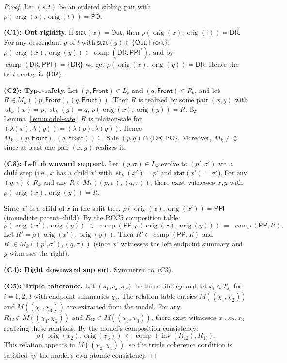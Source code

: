 \documentclass[11pt]{article}
\theoremstyle{definition}
\theoremstyle{remark}
\newcommand{\DR}{\mathsf{DR}}
\newcommand{\PO}{\mathsf{PO}}
\newcommand{\PP}{\mathsf{PP}}
\newcommand{\PPI}{\mathsf{PPI}}
\newcommand{\st}{\operatorname{st}}
\newcommand{\comp}{\operatorname{comp}}
\newcommand{\inv}{\operatorname{inv}}
\newcommand{\orig}{\operatorname{orig}}
\newcommand{\Safe}{\operatorname{Safe}}
\newcommand{\Out}{\mathsf{Out}}
\newcommand{\Front}{\mathsf{Front}}
\begin{document}
\begin{proof}
Let $(s,t)$ be an ordered sibling pair with
$\rho(\orig(s),\orig(t))=\PO$.

\medskip\noindent\textbf{(C1): Out rigidity.}\;
If $\mathsf{stat}(x)=\Out$, then $\rho(\orig(x),\orig(t))=\DR$.
For any descendant $y$ of $t$ with $\mathsf{stat}(y)\in\{\Out,\Front\}$:
$\rho(\orig(x),\orig(y))\in\comp(\DR,\PPI^*)$, and by
$\comp(\DR,\PPI)=\{\DR\}$ we get $\rho(\orig(x),\orig(y))=\DR$.
Hence the table entry is $\{\DR\}$.\;\checkmark

\medskip\noindent\textbf{(C2): Type-safety.}\;
Let $(p,\Front)\in L_k$ and $(q,\Front)\in R_k$, and let
$R\in M_k((p,\Front),(q,\Front))$.  Then $R$ is realized by some pair
$(x,y)$ with $\st_k(x)=p$, $\st_k(y)=q$, $\rho(\orig(x),\orig(y))=R$.
By Lemma~\ref{lem:model-safe}, $R$ is relation-safe for
$(\lambda(x),\lambda(y))=(\lambda(p),\lambda(q))$.
Hence $M_k((p,\Front),(q,\Front))\subseteq\Safe(p,q)\cap\{\DR,\PO\}$.
Moreover, $M_k\ne\varnothing$ since at least one pair $(x,y)$
realizes it.
\;\checkmark

\medskip\noindent\textbf{(C3): Left downward support.}\;
Let $(p,\sigma)\in L_k$ evolve to $(p',\sigma')$ via a child step
(i.e., $x$ has a child $x'$ with $\st_k(x')=p'$ and
$\mathsf{stat}(x')=\sigma'$).  For any $(q,\tau)\in R_k$ and any
$R\in M_k((p,\sigma),(q,\tau))$, there exist witnesses $x,y$ with
$\rho(\orig(x),\orig(y))=R$.

Since $x'$ is a child of $x$ in the split tree,
$\rho(\orig(x),\orig(x'))=\PPI$ (immediate parent--child).  By the
RCC5 composition table:
\[
\rho(\orig(x'),\orig(y)) \;\in\;
  \comp(\PP,\rho(\orig(x),\orig(y))) \;=\; \comp(\PP,R).
\]
Let $R'=\rho(\orig(x'),\orig(y))$.  Then $R'\in\comp(\PP,R)$ and
$R'\in M_k((p',\sigma'),(q,\tau))$ (since $x'$ witnesses the left
endpoint summary and $y$ witnesses the right).
\;\checkmark

\medskip\noindent\textbf{(C4): Right downward support.}\;
Symmetric to~(C3).\;\checkmark

\medskip\noindent\textbf{(C5): Triple coherence.}\;
Let $(s_1,s_2,s_3)$ be three siblings and let $x_i\in T_{s_i}$ for
$i=1,2,3$ with endpoint summaries $\chi_i$.  The relation table
entries $M((\chi_1,\chi_2))$ and $M((\chi_1,\chi_3))$ are extracted
from the model.  For any $R_{12}\in M((\chi_1,\chi_2))$ and
$R_{13}\in M((\chi_1,\chi_3))$, there exist witnesses
$x_1,x_2,x_3$ realizing these relations.  By the model's
composition-consistency:
\[
\rho(\orig(x_2),\orig(x_3)) \;\in\;
  \comp(\inv(R_{12}),R_{13}).
\]
This relation appears in $M((\chi_2,\chi_3))$, so the triple
coherence condition is satisfied by the model's own atomic
consistency.
\;\checkmark
\end{proof}
\end{document}
